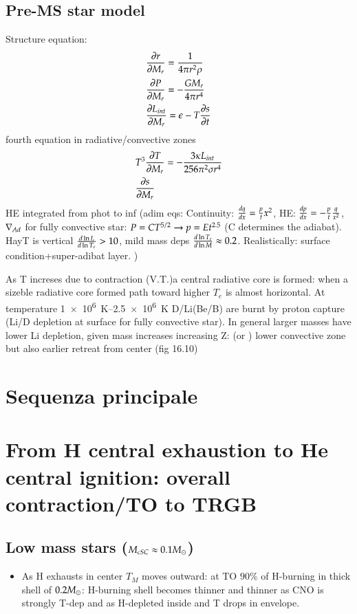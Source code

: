 \documentclass[main.tex]{subfiles}
\begin{document}
\subsection{Pre-MS star model}
Structure equation:
\begin{align*}
&\PDy{M_r}{r}=\frac{1}{4\pi r^2\rho}\\
&\PDy{M_r}{P}=-\frac{GM_r}{4\pi r^4}\\
&\PDy{M_r}{L_{int}}=\epsilon-T\PDy{t}{s}
\end{align*}
fourth equation in radiative/convective zones
\begin{align*}
&T^3\PDy{M_r}{T}=-\frac{3\kappa L_{int}}{256\pi^2\sigma r^4}\\
&\PDy{M_r}{s}
\end{align*}
HE integrated from phot to inf
(adim eqs:
Continuity: $\TDy{x}{q}=\frac{p}{t}x^2$, HE: $\TDy{x}{p}=-\frac{p}{t}\frac{q}{x^2}$, $\nad$ for fully convective star: $P=CT\expy{5/2}\to p=Et\expy{2.5}$ (C determines the adiabat).
HayT is vertical $\TDly{T_e}{L}>10$, mild mass deps $\TDly{M}{T_e}\approx0.2$. Realistically: surface condition+super-adibat layer.
)

As T increses due to contraction (V.T.)a central radiative core is formed: when a sizeble radiative core formed path toward higher $T_e$ is almost horizontal.
At temperature \SIrange{1e6}{2.5e6}{\kelvin} D/Li(Be/B) are burnt by proton capture (Li/D depletion at surface for fully convective star).
In general larger masses have lower Li depletion, given mass increases increasing Z: (or ) lower convective zone but also earlier retreat from center (fig 16.10)


\section{Sequenza principale}

\section{From H central exhaustion to He central ignition: overall contraction/TO to TRGB}

\subsection{Low mass stars ($M_{cSC}\approx0.1\msun$)}

\begin{itemize}
\item As H exhausts in center $T_M$ moves outward: at TO $90\%$ of H-burning in thick shell of $0.2\msun$: H-burning shell becomes thinner and thinner as CNO is strongly T-dep and as H-depleted inside and T drops in envelope.
\end{itemize} 
\end{document}
